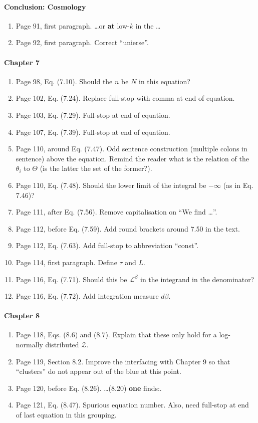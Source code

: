 \documentclass[11pt]{article}
\begin{document}
\paragraph{Conclusion: Cosmology}
\begin{enumerate}
\item Page 91, first paragraph. \ldots or \textbf{at} low-$k$ in the
  \ldots
\item Page 92, first paragraph. Correct ``unierse''.
\end{enumerate}

\paragraph{Chapter 7}
\begin{enumerate}
\item Page 98, Eq. (7.10). Should the $n$ be $N$ in this equation?
\item Page 102, Eq. (7.24). Replace full-stop with comma at end of
  equation.
\item Page 103, Eq. (7.29). Full-stop at end of equation.
\item Page 107, Eq. (7.39). Full-stop at end of equation.
\item Page 110, around Eq. (7.47). Odd sentence construction (multiple
  colons in sentence) above the equation. Remind the reader what is
  the relation of the $\theta_i$ to $\Theta$ (is the latter the set of
  the former?). 
\item Page 110, Eq. (7.48). Should the lower limit of the integral be
  $-\infty$ (as in Eq. 7.46)?
\item Page 111, after Eq. (7.56). Remove capitalisation on ``We find
  \ldots''.
\item Page 112, before Eq. (7.59). Add round brackets around 7.50 in
  the text.
\item Page 112, Eq. (7.63). Add full-stop to abbreviation ``const''.
\item Page 114, first paragraph. Define $\tau$ and $L$.
\item Page 116, Eq. (7.71). Should this be $\mathcal{L}^\beta$ in the
  integrand in the denominator?
\item Page 116, Eq. (7.72). Add integration measure $d\beta$.
\end{enumerate}

\paragraph{Chapter 8}
\begin{enumerate}
\item Page 118, Eqs. (8.6) and (8.7). Explain that these only hold for
  a log-normally distributed $\mathcal{Z}$.
\item Page 119, Section 8.2. Improve the interfacing with Chapter 9 so
  that ``clusters'' do not appear out of the blue at this point.
\item Page 120, before Eq. (8.26).  \ldots (8.20) \textbf{one} finds:.
\item Page 121, Eq. (8.47). Spurious equation number. Also, need
  full-stop at end of last equation in this grouping.
\end{enumerate}
\end{document}
